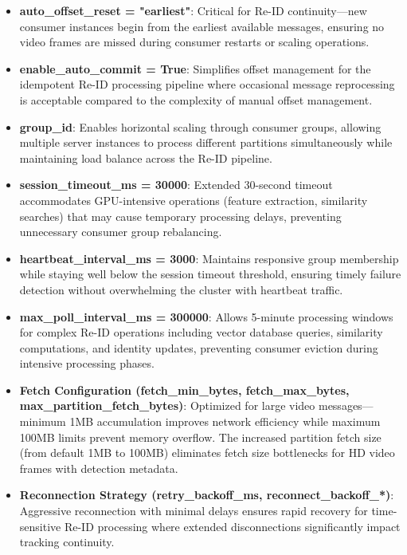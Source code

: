 \begin{itemize}
    \item \textbf{auto\_offset\_reset = "earliest"}: Critical for Re-ID continuity—new consumer instances begin from the earliest available messages, ensuring no video frames are missed during consumer restarts or scaling operations.
    
    \item \textbf{enable\_auto\_commit = True}: Simplifies offset management for the idempotent Re-ID processing pipeline where occasional message reprocessing is acceptable compared to the complexity of manual offset management.
    
    \item \textbf{group\_id}: Enables horizontal scaling through consumer groups, allowing multiple server instances to process different partitions simultaneously while maintaining load balance across the Re-ID pipeline.
    
    \item \textbf{session\_timeout\_ms = 30000}: Extended 30-second timeout accommodates GPU-intensive operations (feature extraction, similarity searches) that may cause temporary processing delays, preventing unnecessary consumer group rebalancing.
    
    \item \textbf{heartbeat\_interval\_ms = 3000}: Maintains responsive group membership while staying well below the session timeout threshold, ensuring timely failure detection without overwhelming the cluster with heartbeat traffic.
    
    \item \textbf{max\_poll\_interval\_ms = 300000}: Allows 5-minute processing windows for complex Re-ID operations including vector database queries, similarity computations, and identity updates, preventing consumer eviction during intensive processing phases.
    
    \item \textbf{Fetch Configuration (fetch\_min\_bytes, fetch\_max\_bytes, max\_partition\_fetch\_bytes)}: Optimized for large video messages—minimum 1MB accumulation improves network efficiency while maximum 100MB limits prevent memory overflow. The increased partition fetch size (from default 1MB to 100MB) eliminates fetch size bottlenecks for HD video frames with detection metadata.
    
    \item \textbf{Reconnection Strategy (retry\_backoff\_ms, reconnect\_backoff\_*)}: Aggressive reconnection with minimal delays ensures rapid recovery for time-sensitive Re-ID processing where extended disconnections significantly impact tracking continuity.
\end{itemize}

